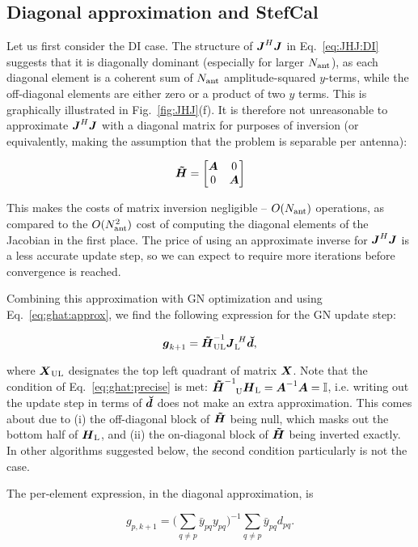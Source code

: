 \documentclass[useAMS,usenatbib]{mn2e}
\makeatletter
\newcommand{\II}{\mathbb{I}}
\newcommand{\vecg}{\bmath{g}}
\newcommand{\mat}[1]{{\bmath{#1}}}
\newcommand{\JJ}{\mat{J}} %
\newcommand{\HH}{\mat{H}} %
\newcommand{\HHa}{\mat{\tilde{H}}} %
\newcommand{\JHJ}{\JJ^H\JJ} %
\newcommand{\Matrix}[2]{\left [ \begin{array}{@{}#1@{}}#2\end{array} \right ]}
\newcommand{\AUG}[1]{\bmath{\breve{#1}}}
\newcommand{\Dd}{\AUG{d}}
\newcommand{\TOP}{\mathrm{U}}%
\newcommand{\LEFT}{\mathrm{L}}
\newcommand{\UL}{\mathrm{UL}}%
\newcommand{\StefCal}{{\sc StefCal}}
\makeatother
\begin{document}
\subsection{Diagonal approximation and \StefCal}
\label{sec:DI:stefcal}

Let us first consider the DI case. The structure of $\JJ^H\JJ$ in Eq.~\ref{eq:JHJ:DI} suggests that it is diagonally 
dominant (especially for larger $N_\mathrm{ant}$), as each diagonal element is a coherent sum of $N_\mathrm{ant}$ amplitude-squared $y$-terms, 
while the off-diagonal elements are either zero or a product of two $y$ terms. This is graphically illustrated in 
Fig.~\ref{fig:JHJ}(f). It is therefore not unreasonable 
to approximate $\JHJ$ with a diagonal matrix for purposes of inversion (or equivalently, making the assumption that 
the problem is separable per antenna):

\[
\HHa = \Matrix{cc}{\bmath{A}&0\\0&\bmath{A}}
\]

This makes the costs of matrix inversion negligible -- $O(N_\mathrm{ant})$ operations, as compared to the $O(N_\mathrm{ant}^2)$ cost 
of computing the diagonal elements of the Jacobian in the first place. The price of using an approximate inverse for 
$\JHJ$ is a less accurate update step, so we can expect to require more iterations before convergence is reached.

Combining this approximation with GN optimization and using Eq.~\ref{eq:ghat:approx}, we find the following expression
for the GN update step:

\begin{equation}
\label{eq:stefcal-matrix}
\vecg_{k+1} = \HHa^{-1}_{\UL} \JJ_\LEFT^{~H} \Dd,
\end{equation}

where $\bmath{X}_\UL$ designates the top left quadrant of matrix $\bmath{X}$. Note that the condition of 
Eq.~\ref{eq:ghat:precise} is met: $\HHa^{-1}_{~~~\TOP} \HH_\LEFT=\bmath{A}^{-1}\bmath{A}=\II$, i.e. writing 
out the update step in terms of $\Dd$ does not make an extra approximation. This comes about due to
(i) the off-diagonal block of $\HHa$ being null, which masks out the bottom half of $\HH_\LEFT$, and 
(ii) the on-diagonal block of $\HHa$ being inverted exactly. In other algorithms suggested below, the second
condition particularly is not the case.

The per-element expression, in the diagonal approximation, is

\begin{equation}
\label{eq:stefcal}
g_{p,k+1} = \big( \sum\limits_{q\ne p} \bar{y}_{pq} y_{pq} \big)^{-1} \sum\limits_{q\ne p} \bar{y}_{pq} d_{pq}.
\end{equation}
\end{document}
